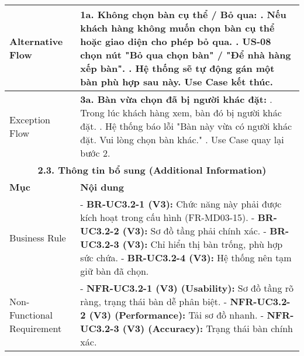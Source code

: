 \begin{longtable}{|m{4cm}|p{11cm}|}
\hline
Alternative Flow & \textbf{1a. Không chọn bàn cụ thể / Bỏ qua:} \newline    1. Nếu khách hàng không muốn chọn bàn cụ thể hoặc giao diện cho phép bỏ qua. \newline    2. US-08 chọn nút "Bỏ qua chọn bàn" / "Để nhà hàng xếp bàn". \newline    3. Hệ thống sẽ tự động gán một bàn phù hợp sau này. Use Case kết thúc. \\
\hline
Exception Flow & \textbf{3a. Bàn vừa chọn đã bị người khác đặt:} \newline    1. Trong lúc khách hàng xem, bàn đó bị người khác đặt. \newline    2. Hệ thống báo lỗi "Bàn này vừa có người khác đặt. Vui lòng chọn bàn khác." \newline    3. Use Case quay lại bước 2. \\
\hline
\multicolumn{2}{|c|}{\textbf{2.3. Thông tin bổ sung (Additional Information)}} \\
\hline
\textbf{Mục} & \textbf{Nội dung} \\
\hline
Business Rule & - \textbf{BR-UC3.2-1 (V3):} Chức năng này phải được kích hoạt trong cấu hình (FR-MD03-15). \newline - \textbf{BR-UC3.2-2 (V3):} Sơ đồ tầng phải chính xác. \newline - \textbf{BR-UC3.2-3 (V3):} Chỉ hiển thị bàn trống, phù hợp sức chứa. \newline - \textbf{BR-UC3.2-4 (V3):} Hệ thống nên tạm giữ bàn đã chọn. \\
\hline
Non-Functional Requirement & - \textbf{NFR-UC3.2-1 (V3) (Usability):} Sơ đồ tầng rõ ràng, trạng thái bàn dễ phân biệt. \newline - \textbf{NFR-UC3.2-2 (V3) (Performance):} Tải sơ đồ nhanh. \newline - \textbf{NFR-UC3.2-3 (V3) (Accuracy):} Trạng thái bàn chính xác. \\
\hline
\end{longtable}

